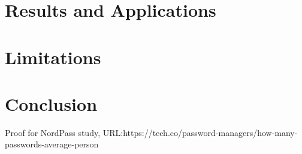 \documentclass[conference]{IEEEtran}
\begin{document}
\section{Results and Applications}

\section{Limitations}

\section{Conclusion}




\listoffigures

\begin{thebibliography}{00}

     Proof for NordPass study, URL:https://tech.co/password-managers/how-many-passwords-average-person

\end{thebibliography}
\end{document}
